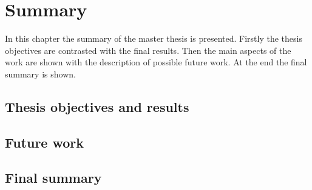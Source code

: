 \chapter{Summary}
In this chapter the summary of the master thesis is presented. Firstly the thesis objectives are contrasted with the final results. Then the main aspects of the work are shown with the description of possible future work. At the end the final summary is shown. 

\section{Thesis objectives and results}
\section{Future work}
\section{Final summary}